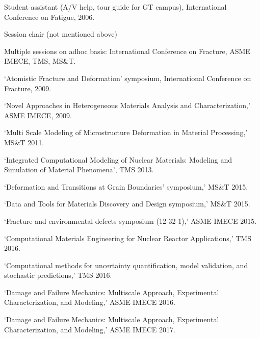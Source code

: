 \begin{list2}
\item Student assistant (A/V help, tour guide for GT campus), International Conference on Fatigue, 2006.
\item Session chair (not mentioned above)
\begin{list2}
\item Multiple sessions on adhoc basis: International Conference on Fracture, ASME IMECE, TMS, MS\&T.
\item `Atomistic Fracture and Deformation' symposium, International Conference on Fracture, 2009.
\item `Novel Approaches in Heterogeneous Materials Analysis and Characterization,' ASME IMECE, 2009.
\item `Multi Scale Modeling of Microstructure Deformation in Material Processing,' MS\&T 2011.
\item `Integrated Computational Modeling of Nuclear Materials: Modeling and Simulation of Material Phenomena', TMS 2013.
\item `Deformation and Transitions at Grain Boundaries' symposium,' MS\&T 2015.
\item `Data and Tools for Materials Discovery and Design symposium,' MS\&T 2015.
\item `Fracture and environmental defects symposium (12-32-1),' ASME IMECE 2015.
\item `Computational Materials Engineering for Nuclear Reactor Applications,' TMS 2016.
\item `Computational methods for uncertainty quantification, model validation, and stochastic predictions,' TMS 2016.
\item `Damage and Failure Mechanics: Multiscale Approach, Experimental Characterization, and Modeling,' ASME IMECE 2016.
\item `Damage and Failure Mechanics: Multiscale Approach, Experimental Characterization, and Modeling,' ASME IMECE 2017.
\end{list2}

\end{list2}


